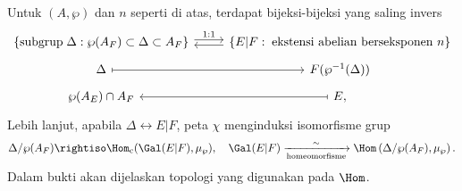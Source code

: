\begin{theorem}\label{prop:abstract-Kummer}
	Untuk $(A, \wp)$ dan $n$ seperti di atas, terdapat bijeksi-bijeksi yang saling invers
	\[\begin{tikzcd}[row sep=tiny]
		\left\{ \text{subgrup}\; \Delta: \wp(A_F) \subset \Delta \subset A_F \right\} \arrow[r, yshift=0.5ex, "1:1"] & \left\{ E|F:\; \text{ekstensi abelian berseksponen $n$} \right\} \arrow[l, yshift=-0.5ex] \\
		\Delta \arrow[mapsto, r] & F(\wp^{-1}(\Delta)) \\
		\wp(A_E) \cap A_F & E \arrow[mapsto, l],
	\end{tikzcd}\]
	Lebih lanjut, apabila $\Delta \leftrightarrow E|F$, peta $\chi$ menginduksi isomorfisme grup
	\begin{equation}\label{eqn:Kummer-isomorphism}
		\Delta/\wp(A_F) \rightiso \Hom_{\mathrm{c}}(\Gal(E|F), \mu_\wp), \quad \Gal(E|F) \xrightarrow[\text{homeomorfisme}]{\sim} \Hom\left( \Delta/\wp(A_F), \mu_\wp \right).
	\end{equation}
	Dalam bukti akan dijelaskan topologi yang digunakan pada $\Hom$.
\end{theorem}

